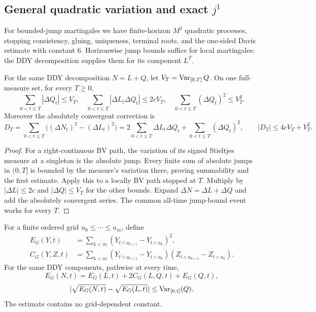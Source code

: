 \subsection{General quadratic variation and exact \texorpdfstring{$j^1$}{j1}}
For bounded-jump martingales we have finite-horizon $M^2$ quadratic processes,
stopping consistency, gluing, uniqueness, terminal roots, and the one-sided
Davis estimate with constant $6$. Horizonwise jump bounds suffice for local
martingales; the DDY decomposition supplies them for its component $L^T$.

\begin{lemma}
For the same DDY decomposition $N=L+Q$, let $V_T=\operatorname{Var}_{[0,T]}Q$.
On one full-measure set, for every $T\geq0$,
\[
 \sum_{0<t\leq T}|\Delta Q_t|\leq V_T,\quad
 \sum_{0<t\leq T}|\Delta L_t\Delta Q_t|\leq2cV_T,\quad
 \sum_{0<t\leq T}(\Delta Q_t)^2\leq V_T^2.
\]
Moreover the absolutely convergent correction is
\[
 D_T=\sum_{0<t\leq T}\bigl((\Delta N_t)^2-(\Delta L_t)^2\bigr)
 =2\sum_{0<t\leq T}\Delta L_t\Delta Q_t+\sum_{0<t\leq T}(\Delta Q_t)^2,
 \qquad |D_T|\leq4cV_T+V_T^2.
\]
\end{lemma}
\begin{proof}
For a right-continuous BV path, the variation of its signed Stieltjes measure
at a singleton is the absolute jump. Every finite sum of absolute jumps in
$(0,T]$ is bounded by the measure's variation there, proving summability and
the first estimate. Apply this to a locally BV path stopped at $T$.
Multiply by $|\Delta L|\leq2c$ and $|\Delta Q|\leq V_T$ for the other bounds.
Expand $\Delta N=\Delta L+\Delta Q$ and add the absolutely convergent series.
The common all-time jump-bound event works for every $T$.
\end{proof}
\begin{lemma}
For a finite ordered grid $u_0\leq\cdots\leq u_m$, define
\[
 \begin{aligned}
 E_G(Y,t)&=\sum_{k<m}(Y_{t\wedge u_{k+1}}-Y_{t\wedge u_k})^2,\\
 C_G(Y,Z,t)&=\sum_{k<m}(Y_{t\wedge u_{k+1}}-Y_{t\wedge u_k})
                       (Z_{t\wedge u_{k+1}}-Z_{t\wedge u_k}).
 \end{aligned}
\]
For the same DDY components, pathwise at every time,
\[
 E_G(N,t)=E_G(L,t)+2C_G(L,Q,t)+E_G(Q,t),
\]
\[
 |\sqrt{E_G(N,t)}-\sqrt{E_G(L,t)}|\leq\operatorname{Var}_{[0,t]}(Q).
\]
The estimate contains no grid-dependent constant.
\end{lemma}
